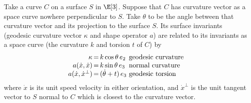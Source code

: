 \begin{lemma}
Take a curve \(C\) on a surface \(S\) in \(\E[3]\).
Suppose that \(C\) has curvature vector as a space curve nowhere perpendicular to \(S\).
Take \(\theta\) to be the angle between that curvature vector and its projection to the surface \(S\).
Its surface invariants (geodesic curvature vector \(\kappa\) and shape operator \(a\)) are related to its invariants as a space curve (the curvature \(k\) and torsion \(t\) of \(C\)) by
\[
\begin{array}{r@{\,=\,}l@{~}>{$\upshape}l<{$}}
\kappa&k\cos \theta \, e_2&geodesic curvature\\
a(\dot{x},\dot{x})&k\sin \theta \, e_3&normal curvature\\
a(\dot{x},\dot{x}^{\perp})&(\dot\theta+t)\,e_3&geodesic torsion
\end{array}
\]
where \(\dot{x}\) is its unit speed velocity in either orientation, and \(\dot{x}^{\perp}\) is the unit tangent vector to \(S\) normal to \(C\) which is closest to the curvature vector. 
\end{lemma}
